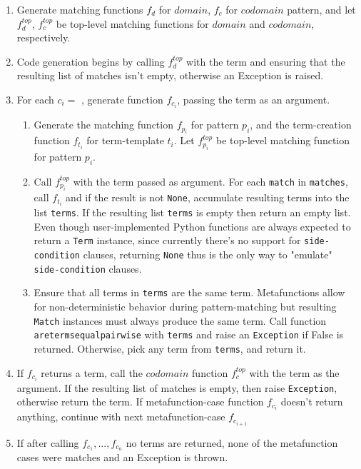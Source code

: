 \begin{enumerate}
\item Generate matching functions $f_d$ for $domain$, $f_c$ for $codomain$ pattern, and let $f_d^{top}$, $f_c^{top}$ be top-level matching functions for $domain$ and $codomain$, respectively.
\item Code generation begins by calling $f_d^{top}$ with the term and ensuring that the resulting list of matches isn't empty, otherwise an Exception is raised.
\item For each $c_i =$ \MetafunctionCase[$p_i$][$t_i$], generate function $f_{c_i}$, passing the term as an argument.
\begin{enumerate}
	\item Generate the matching function $f_{p_i}$ for pattern $p_i$, and the term-creation function $f_{t_i}$ for term-template $t_i$. Let $f_{p_i}^{top}$ be top-level matching function for pattern $p_i$.
	\item Call $f_{p_i}^{top}$ with the term passed as argument. For each \texttt{match} in \texttt{matches}, call $f_{t_i}$ and if the result is not \texttt{None}, accumulate resulting terms into the list \texttt{terms}. If the resulting list \texttt{terms} is empty then return an empty list. Even though user-implemented Python functions are always expected to return a \texttt{Term} instance, since currently there's no support for \texttt{side-condition} clauses, returning \texttt{None} thus is the only way to "emulate" \texttt{side-condition} clauses.
	\item Ensure that all terms in \texttt{terms} are the same term. Metafunctions allow for non-deterministic behavior during pattern-matching but resulting \texttt{Match} instances must always produce the same term. Call function \newline \texttt{aretermsequalpairwise} with \texttt{terms} and raise an \texttt{Exception} if False is returned. Otherwise, pick any term from \texttt{terms}, and return it.
\end{enumerate}
\item If $f_{c_i}$ returns a term, call the $codomain$ function $f_c^{top}$ with the term as the argument. If the resulting list of matches is empty, then raise \texttt{Exception}, otherwise return the term. If metafunction-case function $f_{c_i}$ doesn't return anything, continue with next metafunction-case $f_{c_{i+1}}$
\item If after calling $f_{c_1}, ..., f_{c_n}$ no terms are returned, none of the metafunction cases were matches and an Exception is thrown.
\end{enumerate}

